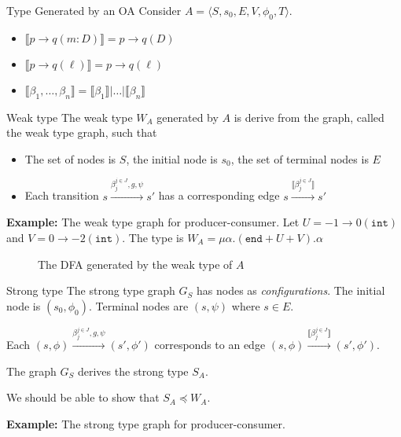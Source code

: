 \begin{frame}{Type Generated by an OA}
  Consider $A=\langle S, s_0, E, V, \phi_0, T\rangle$.
  \begin{itemize}
    \item $\llbracket p\to q(m : D)\rrbracket = p\to q(D)$
    \item $\llbracket p\to q(\ell)\rrbracket = p\to q(\ell)$
    \item $\llbracket \beta_1,\ldots,\beta_n \rrbracket = \llbracket \beta_1 \rrbracket | \ldots | \llbracket \beta_n \rrbracket$
  \end{itemize}
\end{frame}

\begin{frame}{Weak type}
  The weak type $W_A$ generated by $A$ is derive from the graph, called the weak type graph, such that
  \begin{itemize}
    \item The set of nodes is $S$, the initial node is $s_0$, the set of terminal nodes is $E$
    \item Each transition $s\xrightarrow{\beta_{j}^{j\in J}, g, \psi}s'$ has a corresponding edge $s\xrightarrow{\llbracket \beta_{j}^{j\in J} \rrbracket}s'$
  \end{itemize}

  \textbf{Example:} The weak type graph for producer-consumer. Let $U=-1\to0(\texttt{int})$ and $V=0\to -2(\texttt{int})$. The type is $W_A=\mu\alpha.(\texttt{end}+U+V).\alpha$

  \begin{figure}[ht]
    \centering
    \caption{The DFA generated by the weak type of $A$}
  \end{figure}
\end{frame}

\begin{frame}{Strong type}
  The strong type graph $G_S$ has nodes as \textit{configurations}. The initial node is $(s_0,\phi_0)$. Terminal nodes are $(s, \psi)$ where $s\in E$.

  Each $(s,\phi)\xrightarrow{\beta_{j}^{j\in J}, g, \psi}(s',\phi')$ corresponds to an edge $(s,\phi)\xrightarrow{\llbracket\beta_{j}^{j\in J}\rrbracket}(s',\phi')$.

  The graph $G_S$ derives the strong type $S_A$.

  We should be able to show that $S_A\preceq W_A$.

  \textbf{Example:} The strong type graph for producer-consumer.

\end{frame}

